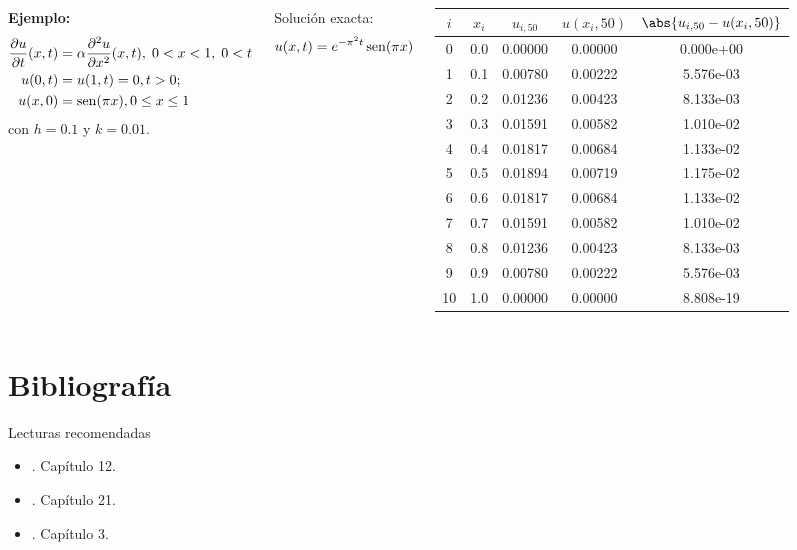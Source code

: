 \documentclass[9pt, aspectratio=169]{beamer}
\begin{document}
\begin{frame}
\begin{columns}
\textbf{Ejemplo:} 
\begin{align*}
\frac{\partial u}{\partial t} (x, t) &= \alpha \frac{\partial^2 u}{\partial x^2}(x, t), \; 0 < x < 1, \; 0 < t \\
u(0, t) &= u(1, t) = 0, t > 0; \\
u(x, 0) &= \operatorname{sen}(\pi x), 0 \leq x \leq 1
\end{align*}
con $h = 0.1$ y \alert{$k = 0.01$}.

Solución exacta:
\[u(x, t) = e^{-\pi^2 t} \operatorname{sen} (\pi x) \]

\begin{center}
\begin{tabular}{ccccc}
\toprule
$i$ & $x_i$ & $u_{i,50}$ & $u(x_i, 50)$ & $\abs{u_{i, 50} - u(x_i, 50)}$ \\
\midrule
0 & 0.0 & 0.00000 & 0.00000 & 0.000e+00 \\
1 & 0.1 & 0.00780 & 0.00222 & 5.576e-03 \\
2 & 0.2 & 0.01236 & 0.00423 & 8.133e-03 \\
3 & 0.3 & 0.01591 & 0.00582 & 1.010e-02 \\
4 & 0.4 & 0.01817 & 0.00684 & 1.133e-02 \\
5 & 0.5 & 0.01894 & 0.00719 & 1.175e-02 \\
6 & 0.6 & 0.01817 & 0.00684 & 1.133e-02 \\
7 & 0.7 & 0.01591 & 0.00582 & 1.010e-02 \\
8 & 0.8 & 0.01236 & 0.00423 & 8.133e-03 \\
9 & 0.9 & 0.00780 & 0.00222 & 5.576e-03 \\
10 & 1.0 & 0.00000 & 0.00000 & 8.808e-19 \\
\bottomrule
\end{tabular} 
\end{center}
\end{columns} \pause
\end{frame}






\section*{Bibliografía}
\begin{frame}[allowframebreaks]{Lecturas recomendadas}
\begin{itemize}
    \item {}. Capítulo 12.
\item {}. Capítulo 21.
    \item {}. Capítulo 3.
\end{itemize}
\end{frame}
\end{document}
